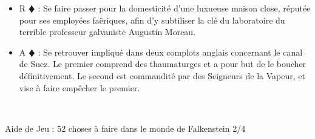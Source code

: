 \documentclass[a5paper,pagesize,french]{book}
\begin{document}
\begin{itemize}
	\item[] R{\color{red} $\vardiamond$ } : Se faire passer pour la domesticité d'une luxueuse maison close, réputée pour ses employées faëriques, afin d'y subtiliser la clé du laboratoire du terrible professeur galvaniste Augustin Moreau.
	\item[] A{\color{red} $\vardiamond$ } : Se retrouver impliqué dans deux complots anglais concernant le canal de Suez. Le premier comprend des thaumaturges et a pour but de le boucher définitivement. Le second est commandité par des Seigneurs de la Vapeur, et vise à faire empêcher le premier.
\end{itemize}~\\

\clearpage

\begin{center}
	{ \LARGE{ \setmainfont{Z003} Aide de Jeu : 52 choses à faire dans le monde de Falkenstein 2/4 } }
\end{center}

\end{document}
